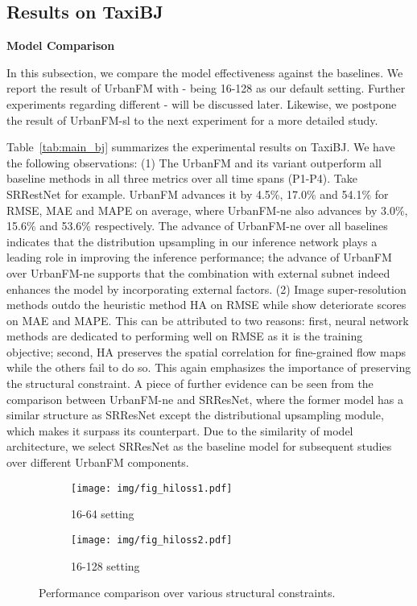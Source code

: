\subsection{Results on TaxiBJ}
\noindent\textbf{Model Comparison}

\noindent In this subsection, we compare the model effectiveness against the baselines. We report the result of UrbanFM with - being 16-128 as our default setting. Further experiments regarding different - will be discussed later. Likewise, we postpone the result of UrbanFM-sl to the next experiment for a more detailed study.

Table~\ref{tab:main_bj} summarizes the experimental results on TaxiBJ. We have the following observations: (1) The UrbanFM and its variant outperform all baseline methods in all three metrics over all time spans (P1-P4). Take SRRestNet for example. UrbanFM advances it by 4.5\%, 17.0\% and 54.1\% for RMSE, MAE and MAPE on average, where UrbanFM-ne also advances by 3.0\%, 15.6\% and 53.6\% respectively. The advance of UrbanFM-ne over all baselines indicates that the distribution upsampling in our inference network plays a leading role in improving the inference performance; the advance of UrbanFM over UrbanFM-ne supports that the combination with external subnet indeed enhances the model by incorporating external factors. (2) Image super-resolution methods outdo the heuristic method HA on RMSE while show deteriorate scores on MAE and MAPE. This can be attributed to two reasons: first, neural network methods are dedicated to performing well on RMSE as it is the training objective; second, HA preserves the spatial correlation for fine-grained flow maps while the others fail to do so. This again emphasizes the importance of preserving the structural constraint. A piece of further evidence can be seen from the comparison between UrbanFM-ne and SRResNet, where the former model has a similar structure as SRResNet except the distributional upsampling module, which makes it surpass its counterpart. Due to the similarity of model architecture, we select SRResNet as the baseline model for subsequent studies over different UrbanFM components.

\begin{figure}[!b]
	\centering
	\vspace{-1em}
	\begin{subfigure}[b]{0.23\textwidth}
		\texttt{[image: img/fig\_hiloss1.pdf]}
		\caption{16-64 setting}
		\label{fig:hiloss1}
	\end{subfigure}
	\begin{subfigure}[b]{0.23\textwidth}
		\texttt{[image: img/fig\_hiloss2.pdf]}
		\caption{16-128 setting}
		\label{fig:hiloss2}
	\end{subfigure}
	\vspace{-1em}
	\caption{Performance comparison over various structural constraints.}
	\label{fig:hiloss}
\end{figure}



